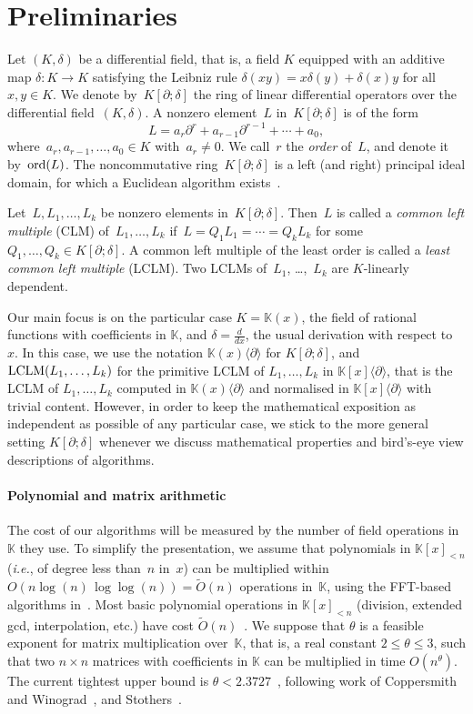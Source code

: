 \documentclass{sig-alt-full}
\def\K {\ensuremath{\mathbb{K}}}
\newcommand{\x}{x}
\newcommand{\Dx}{\partial}
\newcommand{\pa} { \partial}
\newcommand{\ie}{{\it i.e.}}
\newcommand{\ord} { {\rm ord}}
\newcommand{\lclm} { {\rm LCLM}}
\newcommand{\bigOsoft}{\widetilde{{O}}}
\begin{document}
\section{Preliminaries} \label{SECT:pre} Let $(K,\delta)$ be a differential
field, that is, a field $K$ equipped with an additive map $\delta : K
\rightarrow K$ satisfying the Leibniz rule $\delta(xy) = x\delta(y) +
\delta(x)y$ for all $x,y\in K$. We denote by~$K[\pa ; \delta]$ the ring of
linear differential operators over the differential field~$(K, \delta)$. 
A nonzero element~$L$ in~$K[\pa ; \delta]$ is of the form \[ L = a_r
\pa^r + a_{r-1} \pa^{r-1} + \cdots + a_0, \] where~$a_r, a_{r-1}, \ldots, a_0
\in K$ with~$a_r \neq 0$. We call~$r$ the \emph{order} of~$L$, and denote it
by~$\ord(L)$.
The
noncommutative ring~$K[\pa ; \delta]$ is a left (and right) principal ideal
domain, for which a Euclidean algorithm exists~\cite{Ore32,Ore33}.



Let~$L, L_1, \ldots, L_k$ be nonzero elements in~$K[\pa; \delta]$. Then~$L$ is
called a \emph{common left multiple\/} (CLM) of~$L_1, \ldots, L_k$ if~$L = Q_1 L_1 =
\cdots = Q_k L_k$ for some~$Q_1, \ldots, Q_k \in K[\pa; \delta]$. A common
left multiple of the least order is called a \emph{least common left multiple\/} (LCLM). 
Two LCLMs of~$L_1$, \ldots,~$L_k$ are $K$-linearly
dependent.

\smallskip
Our main focus is on the particular case $K = \K(x)$, the field of
rational functions with coefficients in $\K$, and $\delta = \frac{d}{dx}$, the
usual derivation with respect to~$x$. In this case, we use the notation
$\K(\x)\langle \Dx\rangle$ for $K[\pa ; \delta]$, and $\lclm(L_1,\ldots,L_k)$
for the primitive LCLM of $L_1,\ldots,L_k$ in  $\K[\x]\langle \Dx\rangle$,
that is the LCLM of $L_1,\ldots,L_k$ computed in $\K(\x)\langle \Dx\rangle$ and normalised in $\K[\x]\langle \Dx\rangle$ with trivial content.
However, in order to keep the mathematical exposition as independent as
possible of any particular case, we stick to the more general setting $K[\pa;
\delta]$ whenever we discuss mathematical properties and bird's-eye view
descriptions of algorithms.

\paragraph*{\bf Polynomial and matrix arithmetic} The cost of our algorithms
will be measured by the number of field operations in $\K$ they use. To
simplify the presentation, we assume that polynomials in $\K[x]_{<n}$ (\ie, of degree
less than~$n$ in~$x$) can be multiplied within $O(n \log (n)\,\log\log (n))= \bigOsoft
(n)$ operations in~$\K$, using the FFT-based algorithms
in~\cite{ScSt71,CaKa91}. Most basic polynomial operations in $\K[x]_{<n}$
(division, extended gcd, interpolation, etc.) have cost
$\bigOsoft(n)$~\cite{GaGe03}. We suppose that $\theta$ is a feasible exponent
for matrix multiplication over~$\K$, that is, a real constant $2 \leq \theta 
\le 3$, such that two $n\times n$ matrices with coefficients in $\K$ can be
multiplied in time $O(n^\theta)$. The current tightest upper bound is
$\theta < 2.3727$~\cite{VassilevskaWilliams11}, following work of
Coppersmith and Winograd~\cite{CoWi90}, and Stothers~\cite{Stothers10}.
\end{document}
